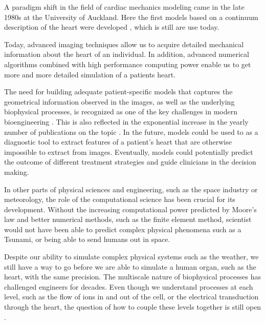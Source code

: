 A paradigm shift in the field of cardiac mechanics modeling came in
the late 1980s at the University of Auckland. Here the first models
based on a continuum description of the heart were developed
\cite{hunter1988analysis}, which is still are use today. 





Today, advanced imaging techniques allow us to acquire detailed
mechanical information about the heart of an individual. In addition,
advanced numerical algorithms combined with high performance computing
power enable us to get more and more detailed simulation of a patients
heart. 



The need for building adequate patient-specific models that captures
the geometrical information observed in the images, as well as the
underlying biophysical processes, is recognized as one of the key
challenges in modern bioengineering \cite{hunter2010vision}. This is
also reflected in the exponential increase in the yearly number of
publications on the topic \cite{sack2016personalised}.
In the future, models could be used to as a diagnostic tool to extract
features of a patient's heart that are otherwise impossible to extract from
images. Eventually, models could potentially predict the outcome of
different treatment strategies and guide clinicians in the decision making.

In other parts of physical sciences and engineering, such as the
space industry or meteorology, the role of the computational
science has been crucial for its development. Without the increasing
computational power predicted by Moore's law
\cite{brock2006understanding} and better numerical methods, such as the
finite element method, scientist would not have been able to predict
complex physical phenomena such as a Tsunami, or being able to send
humans out in space. 

Despite our ability to simulate complex physical systems such as
the weather, we still have a way to go before we are able to
simulate a human organ, such as the heart, with the same precision. The
multiscale nature of biophysical processes has challenged engineers for decades.
Even though we understand processes at each level, such as the flow of
ions in and out of the cell, or the electrical transduction through the
heart, the question of how to couple these levels together is still open
\cite{noble2002modeling}.


